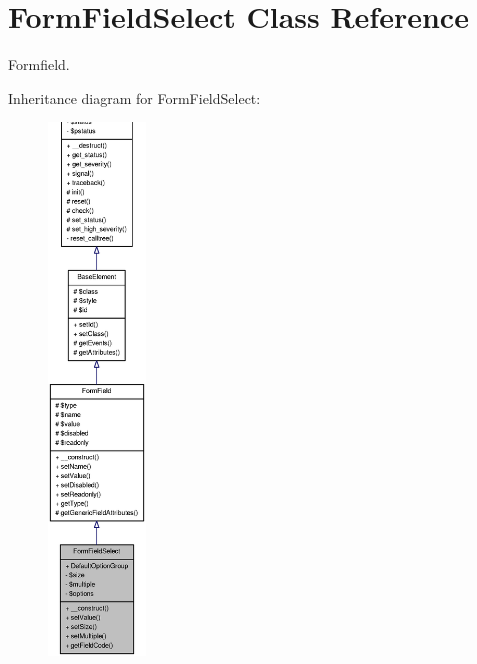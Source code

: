\section{FormFieldSelect Class Reference}
\label{classFormFieldSelect}


Formfield.  




Inheritance diagram for FormFieldSelect:\nopagebreak
\begin{figure}[H]
\begin{center}
\leavevmode
\includegraphics[height=400pt]{classFormFieldSelect__inherit__graph}
\end{center}
\end{figure}


